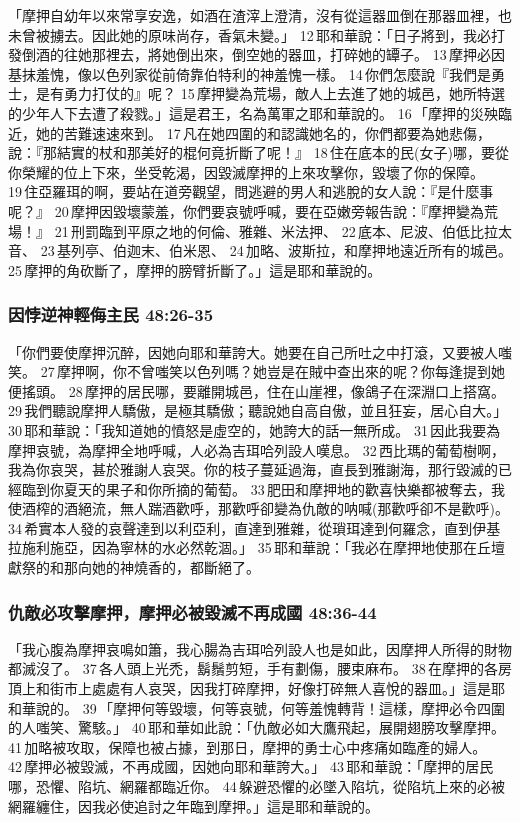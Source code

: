 「摩押自幼年以來常享安逸，如酒在渣滓上澄清，沒有從這器皿倒在那器皿裡，也未曾被擄去。因此她的原味尚存，香氣未變。」 12 耶和華說：「日子將到，我必打發倒酒的往她那裡去，將她倒出來，倒空她的器皿，打碎她的罈子。 13 摩押必因基抹羞愧，像以色列家從前倚靠伯特利的神羞愧一樣。 14 你們怎麼說『我們是勇士，是有勇力打仗的』呢？ 15 摩押變為荒場，敵人上去進了她的城邑，她所特選的少年人下去遭了殺戮。」這是君王，名為萬軍之耶和華說的。 16 「摩押的災殃臨近，她的苦難速速來到。 17 凡在她四圍的和認識她名的，你們都要為她悲傷，說：『那結實的杖和那美好的棍何竟折斷了呢！』 18 住在底本的民(女子)哪，要從你榮耀的位上下來，坐受乾渴，因毀滅摩押的上來攻擊你，毀壞了你的保障。 19 住亞羅珥的啊，要站在道旁觀望，問逃避的男人和逃脫的女人說：『是什麼事呢？』 20 摩押因毀壞蒙羞，你們要哀號呼喊，要在亞嫩旁報告說：『摩押變為荒場！』 21 刑罰臨到平原之地的何倫、雅雜、米法押、 22 底本、尼波、伯低比拉太音、 23 基列亭、伯迦末、伯米恩、 24 加略、波斯拉，和摩押地遠近所有的城邑。 25 摩押的角砍斷了，摩押的膀臂折斷了。」這是耶和華說的。

\subsubsection{因悖逆神輕侮主民 48:26-35}
「你們要使摩押沉醉，因她向耶和華誇大。她要在自己所吐之中打滾，又要被人嗤笑。 27 摩押啊，你不曾嗤笑以色列嗎？她豈是在賊中查出來的呢？你每逢提到她便搖頭。 28 摩押的居民哪，要離開城邑，住在山崖裡，像鴿子在深淵口上搭窩。 29 我們聽說摩押人驕傲，是極其驕傲；聽說她自高自傲，並且狂妄，居心自大。」 30 耶和華說：「我知道她的憤怒是虛空的，她誇大的話一無所成。 31 因此我要為摩押哀號，為摩押全地呼喊，人必為吉珥哈列設人嘆息。 32 西比瑪的葡萄樹啊，我為你哀哭，甚於雅謝人哀哭。你的枝子蔓延過海，直長到雅謝海，那行毀滅的已經臨到你夏天的果子和你所摘的葡萄。 33 肥田和摩押地的歡喜快樂都被奪去，我使酒榨的酒絕流，無人踹酒歡呼，那歡呼卻變為仇敵的呐喊(那歡呼卻不是歡呼)。 34 希實本人發的哀聲達到以利亞利，直達到雅雜，從瑣珥達到何羅念，直到伊基拉施利施亞，因為寧林的水必然乾涸。」 35 耶和華說：「我必在摩押地使那在丘壇獻祭的和那向她的神燒香的，都斷絕了。

\subsubsection{仇敵必攻擊摩押，摩押必被毀滅不再成國 48:36-44}
「我心腹為摩押哀鳴如簫，我心腸為吉珥哈列設人也是如此，因摩押人所得的財物都滅沒了。 37 各人頭上光禿，鬍鬚剪短，手有劃傷，腰束麻布。 38 在摩押的各房頂上和街市上處處有人哀哭，因我打碎摩押，好像打碎無人喜悅的器皿。」這是耶和華說的。 39 「摩押何等毀壞，何等哀號，何等羞愧轉背！這樣，摩押必令四圍的人嗤笑、驚駭。」 40 耶和華如此說：「仇敵必如大鷹飛起，展開翅膀攻擊摩押。 41 加略被攻取，保障也被占據，到那日，摩押的勇士心中疼痛如臨產的婦人。 42 摩押必被毀滅，不再成國，因她向耶和華誇大。」 43 耶和華說：「摩押的居民哪，恐懼、陷坑、網羅都臨近你。 44 躲避恐懼的必墜入陷坑，從陷坑上來的必被網羅纏住，因我必使追討之年臨到摩押。」這是耶和華說的。

